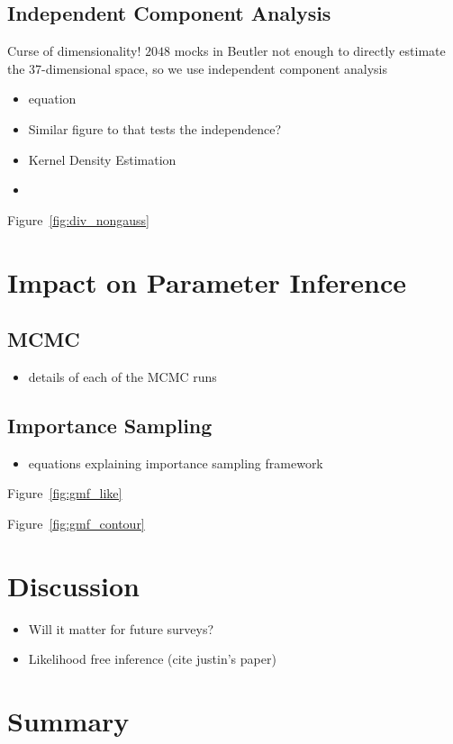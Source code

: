 \documentclass[12pt, letterpaper, preprint]{aastex}
\newcommand{\bitem}{\begin{itemize}}
\newcommand{\eitem}{\end{itemize}}
\begin{document}
\subsection{Independent Component Analysis} 
Curse of dimensionality! $2048$ mocks in Beutler not enough to directly estimate 
the 37-dimensional space, so we use independent component analysis 
\cite{hartlap2009}
\bitem
    \item equation 
    \item Similar figure to \cite{hartlap2009} that tests the independence? 
    \item Kernel Density Estimation 
    \item 
\eitem
Figure~\ref{fig:div_nongauss}

\section{Impact on Parameter Inference}
\subsection{MCMC}
\bitem
    \item details of each of the MCMC runs
\eitem

\subsection{Importance Sampling} 
\bitem
    \item equations explaining importance sampling framework
\eitem
Figure~\ref{fig:gmf_like}


Figure~\ref{fig:gmf_contour}

\section{Discussion}
\bitem
    \item Will it matter for future surveys? 
    \item Likelihood free inference (cite justin's paper) 
\eitem

\section{Summary}
\end{document}

